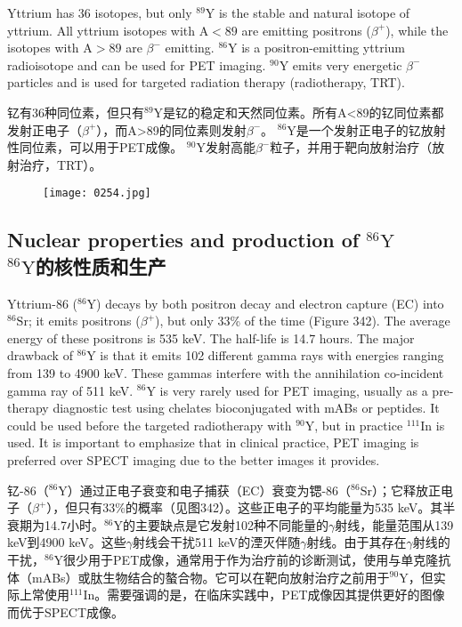 \documentclass[dvipsnames, svgnames,a4paper,11pt]{article}
\begin{document}
Yttrium has 36 isotopes, but only \(\mathrm{^{89}Y}\) is the stable and natural isotope of yttrium. All yttrium isotopes with \(\mathrm{A} < 89\) are emitting positrons (\(\beta^+\)), while the isotopes with \(\mathrm{A} > 89\) are \(\beta^-\) emitting. \(\mathrm{^{86}Y}\) is a positron-emitting yttrium radioisotope and can be used for PET imaging. \(\mathrm{^{90}Y}\) emits very energetic \(\beta^-\) particles and is used for targeted radiation therapy (radiotherapy, TRT).

钇有36种同位素，但只有\(\mathrm{^{89}Y}\)是钇的稳定和天然同位素。所有A<89的钇同位素都发射正电子（\(\beta^+\)），而A>89的同位素则发射\(\beta^-\)。 \(\mathrm{^{86}Y}\)是一个发射正电子的钇放射性同位素，可以用于PET成像。 \(\mathrm{^{90}Y}\)发射高能\(\beta^-\)粒子，并用于靶向放射治疗（放射治疗，TRT）。

\begin{figure}[h]
	\centering
    \texttt{[image: 0254.jpg]}  
     \label{fig341}
\end{figure}


\subsection{Nuclear properties and production of \(\mathrm{^{86}Y}\)\\ \(\mathrm{^{86}Y}\)的核性质和生产}  

Yttrium-86 (\(\mathrm{^{86}Y}\)) decays by both positron decay and electron capture (EC) into \(\mathrm{^{86}Sr}\); it emits positrons (\(\beta^{+}\)), but only 33\% of the time (Figure 342). The average energy of these positrons is 535 keV. The half-life is 14.7 hours. The major drawback of \(\mathrm{^{86}Y}\) is that it emits 102 different gamma rays with energies ranging from 139 to 4900 keV. These gammas interfere with the annihilation co-incident gamma ray of 511 keV. \(\mathrm{^{86}Y}\) is very rarely used for PET imaging, usually as a pre-therapy diagnostic test using chelates bioconjugated with mABs or peptides. It could be used before the targeted radiotherapy with \(\mathrm{^{90}Y}\), but in practice \(\mathrm{^{111}In}\) is used. It is important to emphasize that in clinical practice, PET imaging is preferred over SPECT imaging due to the better images it provides.  

钇-86（\(\mathrm{^{86}Y}\)）通过正电子衰变和电子捕获（EC）衰变为锶-86（\(\mathrm{^{86}Sr}\)）；它释放正电子（\(\beta^{+}\)），但只有33\%的概率（见图342）。这些正电子的平均能量为535 keV。其半衰期为14.7小时。\(\mathrm{^{86}Y}\)的主要缺点是它发射102种不同能量的$\gamma$射线，能量范围从139 keV到4900 keV。这些$\gamma$射线会干扰511 keV的湮灭伴随$\gamma$射线。由于其存在$\gamma$射线的干扰，\(\mathrm{^{86}Y}\)很少用于PET成像，通常用于作为治疗前的诊断测试，使用与单克隆抗体（mABs）或肽生物结合的螯合物。它可以在靶向放射治疗之前用于\(\mathrm{^{90}Y}\)，但实际上常使用\(\mathrm{^{111}In}\)。需要强调的是，在临床实践中，PET成像因其提供更好的图像而优于SPECT成像。
\end{document}
